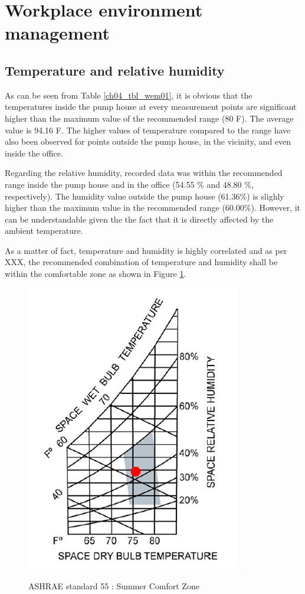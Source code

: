 \section{Workplace environment management}
\subsection{Temperature and relative humidity}
As can be seen from Table \ref{ch04_tbl_wem01}, it is obvious that the temperatures inside the pump house at every measurement points are significant higher than the maximum value of the recommended range (80 F). The average value is 94.16 F. The higher values of temperature compared to the range have also been observed for points outside the pump house, in the vicinity, and even inside the office. 

Regarding the relative humidity, recorded data was within the recommended range inside the pump house and in the office (54.55 \% and 48.80 \%, respectively). The humidity value outside the pump house (61.36\%) is slighly higher than the maximum value in the recommended range (60.00\%). However, it can be understandable given the the fact that it is directly affected by the ambient temperature.

As a matter of fact, temperature and humidity is highly correlated and as per XXX, the recommended combination of temperature and humidity shall be within the comfortable zone as shown in Figure \ref{ch04_fig_wem01}.

\begin{figure}[!htb]
	\includegraphics[scale=2]{figures/ch04_fig_wem01} \\
	\caption{ASHRAE standard 55 : Summer Comfort Zone}
	\label{ch04_fig_wem01} 
\end{figure}

